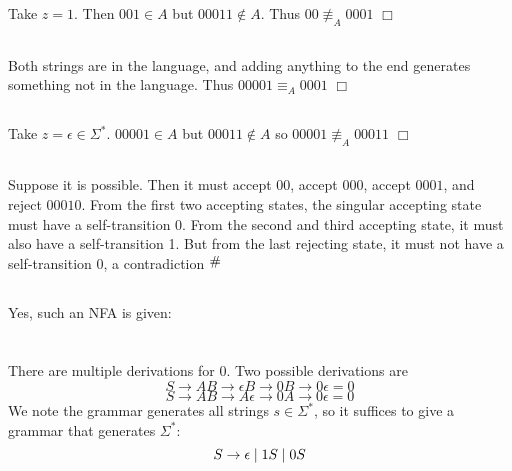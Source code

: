 \documentclass{article}
\newcommand{\contra}{\raisebox{\depth}{\#}}
\begin{document}
\subsection{}
Take $z = 1$. Then $001 \in A$ but $00011 \notin A$. Thus $00 \not\equiv_A 0001$ $\Box$
\subsection{}
Both strings are in the language, and adding anything to the end generates something not in the language. Thus $00001 \equiv_A 0001$ $\Box$
\subsection{}
Take $z = \epsilon \in \Sigma^*$. $00001 \in A$ but $00011 \notin A$ so $00001 \not\equiv_A 00011$ $\Box$
\subsection{}
Suppose it is possible. Then it must accept $00$, accept $000$, accept $0001$, and reject $00010$. From the first two accepting states, the singular accepting state must have a self-transition 0. From the second and third accepting state, it must also have a self-transition 1. But from the last rejecting state, it must not have a self-transition 0, a contradiction $\contra$
\subsection{}
Yes, such an NFA is given:


\section{}
There are multiple derivations for 0. Two possible derivations are
$$S \to AB \to \epsilon B \to 0B \to 0\epsilon = 0$$
$$S \to AB \to A \epsilon \to 0A \to 0\epsilon = 0$$
We note the grammar generates all strings $s \in \Sigma^*$, so it suffices to give a grammar that generates $\Sigma^*$:
\begin{equation*}
S \to \epsilon \;|\; 1S \;|\; 0S\\
\end{equation*}
\end{document}
